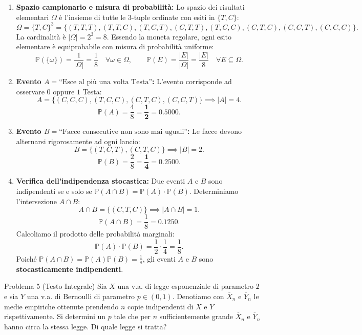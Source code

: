 \documentclass[11pt,a4paper]{article}
\newcommand{\Prob}{\mathbb{P}}
\begin{document}
\begin{soluzionebox}
\begin{enumerate}[label=(\roman*)]
    \item \textbf{Spazio campionario e misura di probabilità:}
    Lo spazio dei risultati elementari $\Omega$ è l'insieme di tutte le 3-tuple ordinate con esiti in $\{T, C\}$:
    \[
    \Omega = \{T, C\}^3 = \{(T,T,T), (T,T,C), (T,C,T), (C,T,T), (T,C,C), (C,T,C), (C,C,T), (C,C,C)\}.
    \]
    La cardinalità è $|\Omega| = 2^3 = 8$. Essendo la moneta regolare, ogni esito elementare è equiprobabile con misura di probabilità uniforme:
    \[
    \Prob(\{\omega\}) = \frac{1}{|\Omega|} = \frac{1}{8} \quad \forall \omega \in \Omega, \qquad \Prob(E) = \frac{|E|}{|\Omega|} = \frac{|E|}{8} \quad \forall E \subseteq \Omega.
    \]

    \item \textbf{Evento $A = \text{``Esce al più una volta Testa''}$:}
    L'evento corrisponde ad osservare $0$ oppure $1$ Testa:
    \[
    A = \{(C,C,C), (T,C,C), (C,T,C), (C,C,T)\} \implies |A| = 4.
    \]
    \[
    \Prob(A) = \frac{4}{8} = \bm{\frac{1}{2}} = \bm{0.5000}.
    \]

    \item \textbf{Evento $B = \text{``Facce consecutive non sono mai uguali''}$:}
    Le facce devono alternarsi rigorosamente ad ogni lancio:
    \[
    B = \{(T,C,T), (C,T,C)\} \implies |B| = 2.
    \]
    \[
    \Prob(B) = \frac{2}{8} = \bm{\frac{1}{4}} = \bm{0.2500}.
    \]

    \item \textbf{Verifica dell'indipendenza stocastica:}
    Due eventi $A$ e $B$ sono indipendenti se e solo se $\Prob(A \cap B) = \Prob(A) \cdot \Prob(B)$.
    Determiniamo l'intersezione $A \cap B$:
    \[
    A \cap B = \{(C,T,C)\} \implies |A \cap B| = 1.
    \]
    \[
    \Prob(A \cap B) = \frac{1}{8} = \bm{0.1250}.
    \]
    Calcoliamo il prodotto delle probabilità marginali:
    \[
    \Prob(A) \cdot \Prob(B) = \frac{1}{2} \cdot \frac{1}{4} = \frac{1}{8}.
    \]
    Poiché $\Prob(A \cap B) = \Prob(A)\Prob(B) = \frac{1}{8}$, gli eventi $A$ e $B$ sono \textbf{stocasticamente indipendenti}.
\end{enumerate}
\end{soluzionebox}

\begin{problemabox}{Problema 5 (Testo Integrale)}
Sia $X$ una v.a. di legge esponenziale di parametro $2$ e sia $Y$ una v.a. di Bernoulli di parametro $p \in (0,1)$. Denotiamo con $\overline{X}_n$ e $\overline{Y}_n$ le medie empiriche ottenute prendendo $n$ copie indipendenti di $X$ e $Y$ rispettivamente. Si determini un $p$ tale che per $n$ sufficientemente grande $\overline{X}_n$ e $\overline{Y}_n$ hanno circa la stessa legge. Di quale legge si tratta?
\end{problemabox}
\end{document}
